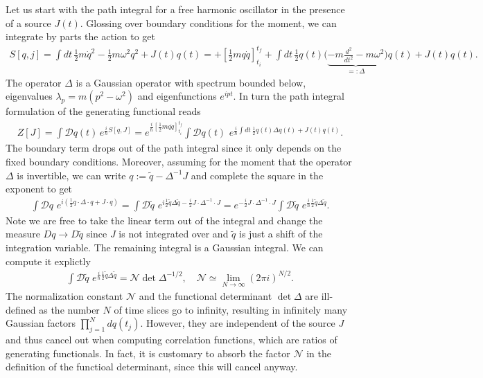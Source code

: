 \documentclass[../QFT_main.tex]{subfiles}
\begin{document}
\begin{mytheorem}
Let us start with the path integral for a free harmonic oscillator in the presence of a source $J(t)$.
Glossing over boundary conditions for the moment, we can integrate by parts the action to get
{\small\begin{align}
    S[q,j]=\int\! dt\, \tfrac12 m\dot{q}^2 - \tfrac12 m\omega^2 q^2 + J(t)q(t) =
    +\left[\tfrac12 m q\dot{q}\right]_{t_i}^{t_f}
    +\int\! dt\, \tfrac12 q(t)\Big(\underbrace{-m\tfrac{d^2}{dt^2}-m\omega^2}_{=:\Delta}\Big)q(t) + J(t)q(t).
\end{align}}
The operator $\Delta$ is a Gaussian operator with spectrum bounded below, eigenvalues $\lambda_p=m(p^2-\omega^2)$ and eigenfunctions $e^{ipt}$.
In turn the path integral formulation of the generating functional reads
{\small\begin{align}
    Z[J] = \int \mathcal{D}q(t)\, e^{\frac{i}{\hbar}S[q,J]} 
    = e^{\frac{i}{\hbar}\left[\tfrac12 m q\dot{q}\right]_{t_i}^{t_f}}
     \int \mathcal{D}q(t)\, \,  e^{\frac{i}{\hbar}  \int dt\, \tfrac12 q(t)\Delta q(t) + J(t)q(t)}.
\end{align}}
The boundary term drops out of the path integral since it only depends on the fixed boundary conditions.
Moreover, assuming for the moment that the operator $\Delta$ is invertible, we can write $q:=\tilde{q}-\Delta^{-1}J$ and complete the square in the exponent to get
{\small\begin{align}
      \int \mathcal{D}q\, \,  e^{i \left(\tfrac12 q\cdot \Delta\cdot q + J\cdot q\right)} = \int \mathcal{D}\tilde{q}\, \,  e^{i \tfrac 12 \tilde{q}\Delta\tilde{q} - \frac{i}{2} J\cdot \Delta^{-1}\cdot J}
      = 
      e^{-\frac{i}{2} J\cdot \Delta^{-1}\cdot J}
      \int \mathcal{D}\tilde{q}\, \,  e^{\frac{i}{\hbar} \tfrac12 \tilde{q}\Delta\tilde{q}}.
\end{align}}
Note we are free to take the linear term out of the integral and change the measure $Dq\to D\tilde{q}$ since $J$ is not integrated over and $\tilde{q}$ is just a shift of the integration variable.
The remaining integral is a Gaussian integral.
We can compute it explictly
{\small\begin{align}
    \int \mathcal{D}\tilde{q}\, \,  e^{\frac{i}{\hbar} \tfrac12 \tilde{q}\Delta\tilde{q}} = \mathcal{N}\det \Delta^{-1/2}, \quad \mathcal{N}\simeq \lim_{N\to\infty} \left(2\pi i\right)^{N/2}.
\end{align}}
The normalization constant $\mathcal{N}$ and the functional determinant $\det \Delta$ are ill-defined as the number $N$ of time slices go to infinity, resulting in infinitely many Gaussian factors $\prod_{j=1}^Ndq(t_j)$.
However, they are independent of the source $J$ and thus cancel out when computing correlation functions, which are ratios of generating functionals.
In fact, it is customary to absorb the factor $\mathcal{N}$ in the definition of the functioal determinant, since this will cancel anyway.


\end{mytheorem}
\end{document}
